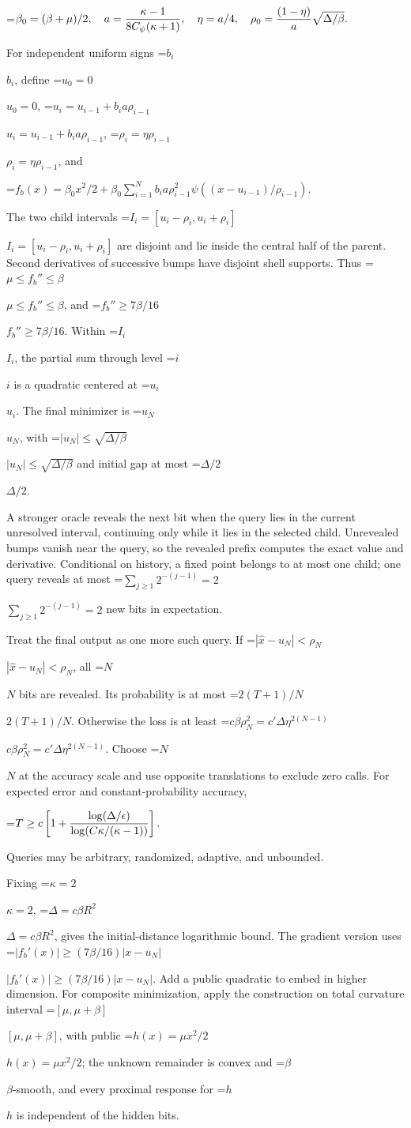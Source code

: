 \documentclass[10pt,a4paper]{article}
\newcommand{\AtlasMath}[1]{\par\begingroup\centering\setbox0=\hbox{$\displaystyle #1$}\ifdim\wd0>1.4\linewidth\typeout{ATLAS WIDE FORMULA: \the\wd0}\fi\ifdim\wd0>\linewidth\resizebox{\linewidth}{!}{\box0}\else\box0\fi\par\endgroup}
\newcommand{\AtlasInlineMath}[1]{\begingroup\setbox0=\hbox{$#1$}\ifdim\wd0>.4\linewidth\endgroup\AtlasMath{#1}\else\endgroup$#1$\fi}
\begin{document}
\AtlasMath{\beta_0=(\beta+\mu)/2,\quad a={\kappa-1\over8C_\psi(\kappa+1)},\quad
\eta=a/4,\quad \rho_0={(1-\eta)\over a}\sqrt{\Delta/\beta}.}

For independent uniform signs \AtlasInlineMath{b_i}, define \AtlasInlineMath{u_0=0},
\AtlasInlineMath{u_i=u_{i-1}+b_i a\rho_{i-1}}, \AtlasInlineMath{\rho_i=\eta\rho_{i-1}}, and

\AtlasMath{f_b(x)=\beta_0x^2/2+
\beta_0\sum_{i=1}^N b_i a\rho_{i-1}^2
\psi((x-u_{i-1})/\rho_{i-1}).}

The two child intervals \AtlasInlineMath{I_i=[u_i-\rho_i,u_i+\rho_i]} are disjoint and lie inside the central half of the parent. Second derivatives of successive bumps have disjoint shell supports. Thus \AtlasInlineMath{\mu\le f_b''\le\beta}, and \AtlasInlineMath{f_b''\ge7\beta/16}. Within \AtlasInlineMath{I_i}, the partial sum through level \AtlasInlineMath{i} is a quadratic centered at \AtlasInlineMath{u_i}. The final minimizer is \AtlasInlineMath{u_N}, with \AtlasInlineMath{|u_N|\le\sqrt{\Delta/\beta}} and initial gap at most \AtlasInlineMath{\Delta/2}.

A stronger oracle reveals the next bit when the query lies in the current unresolved interval, continuing only while it lies in the selected child. Unrevealed bumps vanish near the query, so the revealed prefix computes the exact value and derivative. Conditional on history, a fixed point belongs to at most one child; one query reveals at most \AtlasInlineMath{\sum_{j\ge1}2^{-(j-1)}=2} new bits in expectation.

Treat the final output as one more such query. If \AtlasInlineMath{|\widehat x-u_N|<\rho_N}, all \AtlasInlineMath{N} bits are revealed. Its probability is at most \AtlasInlineMath{2(T+1)/N}. Otherwise the loss is at least
\AtlasInlineMath{c\beta\rho_N^2=c'\Delta\eta^{2(N-1)}}.
Choose \AtlasInlineMath{N} at the accuracy scale and use opposite translations to exclude zero calls. For expected error and constant-probability accuracy,

\AtlasMath{T\ge c\left[1+{\log(\Delta/\epsilon)\over
\log(C\kappa/(\kappa-1))}\right].}

Queries may be arbitrary, randomized, adaptive, and unbounded.

Fixing \AtlasInlineMath{\kappa=2}, \AtlasInlineMath{\Delta=c\beta R^2}, gives the initial-distance logarithmic bound. The gradient version uses
\AtlasInlineMath{|f_b'(x)|\ge(7\beta/16)|x-u_N|}.
Add a public quadratic to embed in higher dimension. For composite minimization, apply the construction on total curvature interval \AtlasInlineMath{[\mu,\mu+\beta]}, with public \AtlasInlineMath{h(x)=\mu x^2/2}; the unknown remainder is convex and \AtlasInlineMath{\beta}-smooth, and every proximal response for \AtlasInlineMath{h} is independent of the hidden bits.
\end{document}
